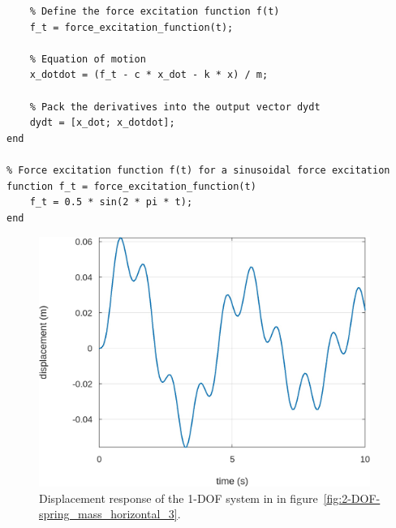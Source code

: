\documentclass[12pt,letter]{article}
\begin{document}
\begin{example}
\begin{lstlisting}
	% Define the force excitation function f(t)
	f_t = force_excitation_function(t);
	
	% Equation of motion
	x_dotdot = (f_t - c * x_dot - k * x) / m;
	
	% Pack the derivatives into the output vector dydt
	dydt = [x_dot; x_dotdot];
end

% Force excitation function f(t) for a sinusoidal force excitation
function f_t = force_excitation_function(t)
	f_t = 0.5 * sin(2 * pi * t);
end
\end{lstlisting}


			\begin{figure}[H]
				\centering
				\includegraphics[width=4.25in]{../figures/ODE_results-1-DOF}
				\caption{Displacement response of the 1-DOF system in in figure~\ref{fig:2-DOF-spring_mass_horizontal_3}.}
				\label{fig:ODE_results}
			\end{figure}				



	
	\end{example}
	

	
\end{document}
